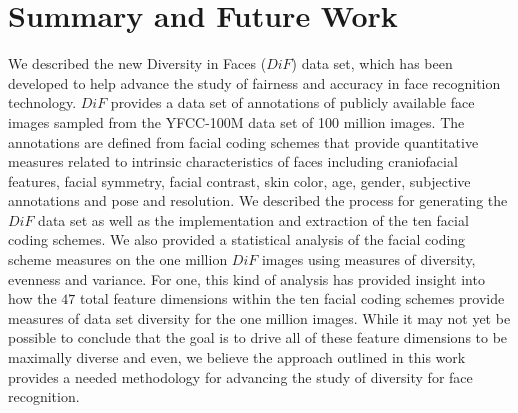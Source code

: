 \documentclass[letterpaper,11pt]{article}
\begin{document}

\section{Summary and Future Work} \label{sec:conclusion}

We described the new Diversity in Faces ($DiF$) data set, which has been developed to help advance the study of fairness and accuracy in face recognition technology.  $DiF$ provides a data set of annotations of publicly available face images sampled from the YFCC-100M data set of 100 million images.  The annotations are defined from facial coding schemes that provide quantitative measures related to intrinsic characteristics of faces including craniofacial features, facial symmetry, facial contrast, skin color, age, gender, subjective annotations and pose and resolution.  We described the process for generating the $DiF$ data set as well as the implementation and extraction of the ten facial coding schemes.  We also provided a statistical analysis of the facial coding scheme measures on the one million $DiF$ images using measures of diversity,  evenness and variance.  For one, this kind of analysis has provided insight into how the $47$ total feature dimensions within the ten facial coding schemes provide measures of data set diversity for the one million images.  While it may not yet be possible to conclude that the goal is to drive all of these feature dimensions to be maximally diverse and even, we believe the approach outlined in this work provides a needed methodology for advancing the study of diversity for face recognition.   
\end{document}
